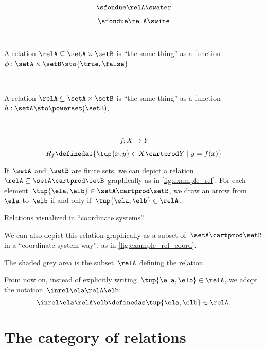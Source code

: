 {\begin{forslides}
        $$ \sfondue \relA \swater \label{eq:slides-17}$$

        $$ \sfondue \relA \swine \label{eq:slides-18}$$

        \
        
        A relation $\relA \subseteq \setA \times \setB$ is ``the same thing'' as a function $\phi : \setA \times \setB \sto \{\true, \false\}$.
        
        \
        
        
        A relation $\relA \subseteq \setA \times \setB$ is ``the same thing'' as a function $h : \setA  \sto \powerset (\setB)$.
        
        \

        $$
            f : X \to Y
        $$

        $$
            R_f \definedas \{ \tup{x, y} \in X \cartprod Y \mid y = f(x) \}
        $$

    \end{forslides}
}


If~$\setA$ and~$\setB$ are finite sets, we can depict a relation~$\relA \subseteq \setA \cartprod \setB$ graphically as in \cref{fig:example_rel}.
For each element~$\tup{\ela,\elb} \in \setA \cartprod \setB$, we draw an arrow from~$\ela$ to~$\elb$ if and only if~$\tup{\ela,\elb} \in \relA$.

\begin{marginfigure}
    \centering
    \caption{Relations visualized in ``coordinate systems''.}
    \label{fig:example_rel_coord}
\end{marginfigure}

We can also depict this relation graphically as a subset of~$\setA \cartprod \setB$ in a ``coordinate system way'', as in \cref{fig:example_rel_coord}.

The shaded grey area is the subset~$\relA$ defining the relation.

\begin{remark}
    From now on, instead of explicitly writing~$\tup{\ela,\elb}\in \relA$, we adopt the notation~$\inrel \ela \relA \elb$:
    \begin{equation}
        \inrel \ela \relA \elb \definedas \tup{\ela,\elb}\in \relA.
    \end{equation}
\end{remark}

\section{The category of relations \Rel}

